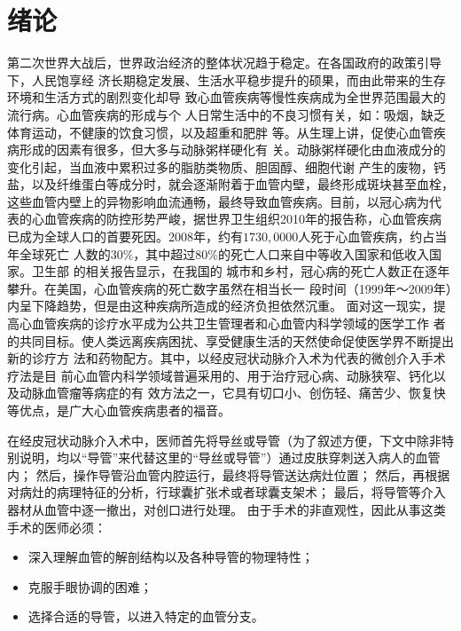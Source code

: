 \chapter{绪\;\;\;论}
\label{chap1}

第二次世界大战后，世界政治经济的整体状况趋于稳定。在各国政府的政策引导下，人民饱享经
济长期稳定发展、生活水平稳步提升的硕果，而由此带来的生存环境和生活方式的剧烈变化却导
致心血管疾病等慢性疾病成为全世界范围最大的流行病\cite{Hu2009}。心血管疾病的形成与个
人日常生活中的不良习惯有关，如：吸烟，缺乏体育运动，不健康的饮食习惯，以及超重和肥胖
等\cite{Go2013}。从生理上讲，促使心血管疾病形成的因素有很多，但大多与动脉粥样硬化有
关。动脉粥样硬化由血液成分的变化引起，当血液中累积过多的脂肪类物质、胆固醇、细胞代谢
产生的废物，钙盐，以及纤维蛋白等成分时，就会逐渐附着于血管内壁，最终形成斑块甚至血栓，
这些血管内壁上的异物影响血流通畅，最终导致血管疾病\cite{cvdaha}。目前，以冠心病为代
表的心血管疾病的防控形势严峻，据世界卫生组织2010年的报告\cite{mho2011}称，心血管疾病
已成为全球人口的首要死因。2008年，约有$1730,0000$人死于心血管疾病，约占当年全球死亡
人数的30\%，其中超过80\%的死亡人口来自中等收入国家和低收入国家\cite{mho2011}。卫生部
的相关报告\cite{moh2010annual}\cite{moh2007annual}\cite{moh2004annual}显示，在我国的
城市和乡村，冠心病的死亡人数正在逐年攀升。在美国，心血管疾病的死亡数字虽然在相当长一
段时间（1999年～2009年）内呈下降趋势，但是由这种疾病所造成的经济负担依然沉重\cite{Go2013}。
面对这一现实，提高心血管疾病的诊疗水平成为公共卫生管理者和心血管内科学领域的医学工作
者的共同目标。使人类远离疾病困扰、享受健康生活的天然使命促使医学界不断提出新的诊疗方
法和药物配方。其中，以经皮冠状动脉介入术\cite{Baim2005}为代表的微创介入手术疗法是目
前心血管内科学领域普遍采用的、用于治疗冠心病、动脉狭窄、钙化以及动脉血管瘤等病症的有
效方法之一，它具有切口小、创伤轻、痛苦少、恢复快等优点，是广大心血管疾病患者的福音。

在经皮冠状动脉介入术中，医师首先将导丝或导管（为了叙述方便，下文中除非特别说明，均以“导管”来代替这里的“导丝或导管”）通过皮肤穿刺送入病人的血管内；
然后，操作导管沿血管内腔运行，最终将导管送达病灶位置；
然后，再根据对病灶的病理特征的分析，行球囊扩张术或者球囊支架术；
最后，将导管等介入器材从血管中逐一撤出，对创口进行处理。
由于手术的非直观性，因此从事这类手术的医师必须\cite{Li2012CUHK}：

\begin{itemize}
  \item 深入理解血管的解剖结构以及各种导管的物理特性；
  \item 克服手眼协调的困难；
  \item 选择合适的导管，以进入特定的血管分支。
\end{itemize}

